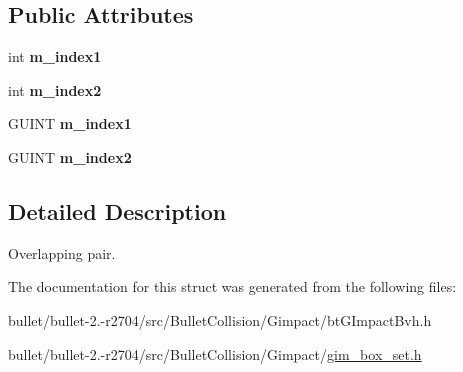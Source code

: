 \subsection*{Public Attributes}
\begin{DoxyCompactItemize}
\item 
\hypertarget{struct_g_i_m___p_a_i_r_aaa47e96faadf96f0cf08af1e3e63bf16}{int {\bfseries m\+\_\+index1}}\label{struct_g_i_m___p_a_i_r_aaa47e96faadf96f0cf08af1e3e63bf16}

\item 
\hypertarget{struct_g_i_m___p_a_i_r_ab4036400db03b1d66a922cae402523ff}{int {\bfseries m\+\_\+index2}}\label{struct_g_i_m___p_a_i_r_ab4036400db03b1d66a922cae402523ff}

\item 
\hypertarget{struct_g_i_m___p_a_i_r_a6acfeb93e6bcd794c8f3765adfdad962}{G\+U\+I\+N\+T {\bfseries m\+\_\+index1}}\label{struct_g_i_m___p_a_i_r_a6acfeb93e6bcd794c8f3765adfdad962}

\item 
\hypertarget{struct_g_i_m___p_a_i_r_a8b9ea4da06cf2f9f55c3c114caac0d91}{G\+U\+I\+N\+T {\bfseries m\+\_\+index2}}\label{struct_g_i_m___p_a_i_r_a8b9ea4da06cf2f9f55c3c114caac0d91}

\end{DoxyCompactItemize}


\subsection{Detailed Description}
Overlapping pair. 

The documentation for this struct was generated from the following files\+:\begin{DoxyCompactItemize}
\item 
bullet/bullet-\/2.-\/r2704/src/\+Bullet\+Collision/\+Gimpact/bt\+G\+Impact\+Bvh.\+h\item 
bullet/bullet-\/2.-\/r2704/src/\+Bullet\+Collision/\+Gimpact/\hyperlink{gim__box__set_8h}{gim\+\_\+box\+\_\+set.\+h}\end{DoxyCompactItemize}

